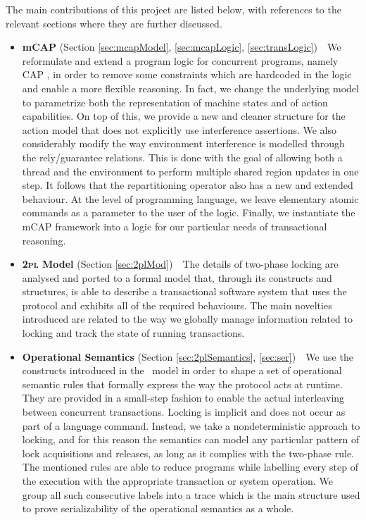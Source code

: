The main contributions of this project are listed below, with references to the relevant sections where they are further discussed.
\begin{itemize}
	\item \textbf{mCAP} (Section \ref{sec:mcapModel}, \ref{sec:mcapLogic}, \ref{sec:transLogic})\ \ We reformulate and extend a program logic for concurrent programs, namely CAP \cite{cap}, in order to remove some constraints which are hardcoded in the logic and enable a more flexible reasoning. In fact, we change the underlying model to parametrize both the representation of machine states and of action capabilities. On top of this, we provide a new and cleaner structure for the action model that does not explicitly use interference assertions. We also considerably modify the way environment interference is modelled through the rely/guarantee relations. This is done with the goal of allowing both a thread and the environment to perform multiple shared region updates in one step. It follows that the repartitioning operator also has a new and extended behaviour. At the level of programming language, we leave elementary atomic commands as a parameter to the user of the logic. Finally, we instantiate the mCAP framework into a logic for our particular needs of transactional reasoning.
	
	\item \textbf{\textsc{2pl} Model} (Section \ref{sec:2plMod})\ \ The details of two-phase locking are analysed and ported to a formal model that, through its constructs and structures, is able to describe a transactional software system that uses the protocol and exhibits all of the required behaviours. The main novelties introduced are related to the way we globally manage information related to locking and track the state of running transactions.
	
	\item \textbf{Operational Semantics} (Section \ref{sec:2plSemantics}, \ref{sec:ser})\ \ We use the constructs introduced in the \tpl\ model in order to shape a set of operational semantic rules that formally express the way the protocol acts at runtime. They are provided in a small-step fashion to enable the actual interleaving between concurrent transactions. Locking is implicit and does not occur as part of a language command. Instead, we take a nondeterministic approach to locking, and for this reason the semantics can model any particular pattern of lock acquisitions and releases, as long as it complies with the two-phase rule. The mentioned rules are able to reduce programs while labelling every step of the execution with the appropriate transaction or system operation. We group all such consecutive labels into a trace which is the main structure used to prove serializability of the operational semantics as a whole. 
	

\end{itemize}
